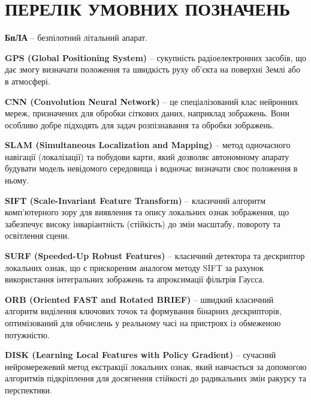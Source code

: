 \documentclass[a4paper, 12pt, titlepage]{article}
\begin{document}

\pagestyle{myheadings}



\newpage
\thispagestyle{empty}
\tableofcontents



\newpage
{}
\setcounter{page}{3}
\section*{\centering ПЕРЕЛІК УМОВНИХ ПОЗНАЧЕНЬ}
\noindent\textbf{БпЛА} -- безпілотний літальний апарат.

\noindent\textbf{GPS (Global Positioning System)} -- сукупність радіоелектронних засобів, що дає змогу визначати положення та швидкість руху об'єкта на поверхні Землі або в атмосфері.

\noindent\textbf{CNN (Convolution Neural Network)} -- це спеціалізований клас нейронних мереж, призначених для обробки сіткових даних, наприклад зображень. Вони особливо добре підходять для задач розпізнавання та обробки зображень.

\noindent\textbf{SLAM (Simultaneous Localization and Mapping)} -- метод одночасного навігації (локалізації) та побудови карти, який дозволяє автономному апарату будувати модель невідомого середовища і водночас визначати своє положення в ньому.

\noindent\textbf{SIFT (Scale-Invariant Feature Transform)} -- класичний алгоритм комп'ютерного зору для виявлення та опису локальних ознак зображення, що забезпечує високу інваріантність (стійкість) до змін масштабу, повороту та освітлення сцени.

\noindent\textbf{SURF (Speeded-Up Robust Features)} -- класичний детектора та дескриптор локальних ознак, що є прискореним аналогом методу SIFT за рахунок використання інтегральних зображень та апроксимації фільтрів Гаусса.

\noindent\textbf{ORB (Oriented FAST and Rotated BRIEF)} -- швидкий класичний алгоритм виділення ключових точок та формування бінарних дескрипторів, оптимізований для обчислень у реальному часі на пристроях із обмеженою потужністю.

\noindent\textbf{DISK (Learning Local Features with Policy Gradient)} -- сучасний нейромережевий метод екстракції локальних ознак, який навчається за допомогою алгоритмів підкріплення для досягнення стійкості до радикальних змін ракурсу та перспективи.
\end{document}
